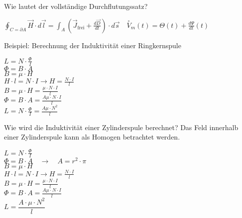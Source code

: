 \begin{karte}{Wie lautet der vollständige Durchflutungssatz?}
	\begin{center}
		$\displaystyle \oint_{C=\partial A} \vec{H} \cdot d \vec{l}=\int_{A}\left(\vec{J}_{\mathrm{frei}}+\frac{d \vec{D}}{d t}\right) \cdot d \vec{s} \quad \stackrel{\circ}{V}_{m}(t)=\Theta(t)+\frac{d \Psi}{d t}(t)$
	\end{center}
	Beispiel: Berechnung der Induktivität einer Ringkernspule\\[10pt]
	\begin{minipage}{0.4\textwidth}
		
	\end{minipage}
	\begin{minipage}{0.6\textwidth}
			$L = N \cdot \frac{\Phi}{I}$\\
			\noindent\hspace*{3mm}
			$\Phi = B \cdot A$\\
			\noindent\hspace*{6mm} 
			$B = \mu \cdot H$\\
			\noindent\hspace*{9mm} 
			$H \cdot l = N \cdot I \rightarrow H = \frac{N \cdot I}{l}$\\
			\noindent\hspace*{6mm} 
			$B = \mu \cdot H = \frac{\mu \cdot N \cdot I}{l}$\\
			\noindent\hspace*{3mm}
			$\Phi = B \cdot A = \frac{A\mu \cdot N \cdot I}{l}$\\
			$L = N \cdot \frac{\Phi}{I} = \frac{A\mu \cdot N^2}{l}$
	\end{minipage}
	
\end{karte}

\begin{karte}{Wie wird die Induktivität einer Zylinderspule berechnet?}
	\flushleft
	Das Feld innerhalb einer Zylinderspule kann als Homogen betrachtet werden.\\[5pt]
	\begin{minipage}{0.37\textwidth}
		
	\end{minipage}
	\begin{minipage}{0.6\textwidth}
		$L = N \cdot \frac{\Phi}{I}$\\
		\noindent\hspace*{3mm}
		$\Phi = B \cdot A \quad \rightarrow \quad A = r^2\cdot\pi$ \\
		\noindent\hspace*{6mm} 
		$B = \mu \cdot H$\\
		\noindent\hspace*{9mm} 
		$H \cdot l = N \cdot I \rightarrow H = \frac{N \cdot I}{l}$\\
		\noindent\hspace*{6mm} 
		$B = \mu \cdot H = \frac{\mu \cdot N \cdot I}{l}$\\
		\noindent\hspace*{3mm}
		$\Phi = B \cdot A = \frac{A\mu \cdot N \cdot I}{l}$\\[5pt]
		$\boxed{L = \dfrac{A \cdot \mu \cdot N^2}{l}}$
	\end{minipage}
\end{karte}

